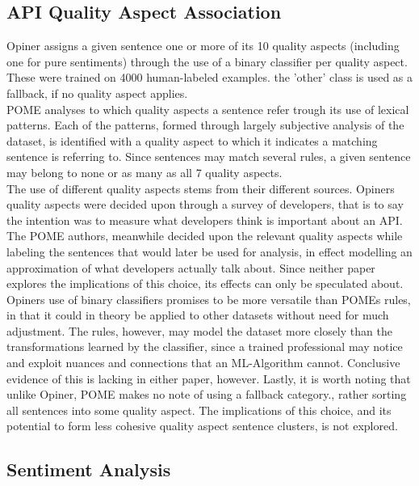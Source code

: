 \documentclass[a4paper,10pt, bibliography=totocnumbered]{scrreprt}
\begin{document}
\subsection{API Quality Aspect Association}
Opiner assigns a given sentence one or more of its 10 quality aspects (including one for pure sentiments) through the use of a binary classifier per quality aspect. These were trained on 4000 human-labeled examples. the 'other' class is used as a fallback, if no quality aspect applies.\\
POME analyses to which quality aspects a sentence refer trough its use of lexical patterns. Each of the patterns, formed through largely subjective analysis of the dataset, is identified with a quality aspect to which it indicates a matching sentence is referring to. Since sentences may match several rules, a given sentence may belong to none or as many as all 7 quality aspects.\\
The use of different quality aspects stems from their different sources. Opiners quality aspects were decided upon through a survey of developers, that is to say the intention was to measure what developers think is important about an API. The POME authors, meanwhile decided upon the relevant quality aspects while labeling the sentences that would later be used for analysis, in effect modelling an approximation of what developers actually talk about. Since neither paper explores the implications of this choice, its effects can only be speculated about. Opiners use of binary classifiers promises to be more versatile than POMEs rules, in that it could in theory be applied to other datasets without need for much adjustment. The rules, however, may model the dataset more closely than the transformations learned by the classifier, since a trained professional may notice and exploit nuances and connections that an ML-Algorithm cannot. Conclusive evidence of this is lacking in either paper, however. Lastly, it is worth noting that unlike Opiner, POME makes no note of using a fallback category., rather sorting all sentences into some quality aspect. The implications of this choice, and its potential to form less cohesive quality aspect sentence clusters, is not explored.

\subsection{Sentiment Analysis}
\end{document}
